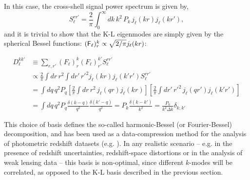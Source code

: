 \documentclass[twocolumn,amsfont,amssymb,amsmath, showpacs,balancelastpage, nofootinbib]{revtex4-1}
\begin{document}
    In this case, the cross-shell signal power spectrum is given by,
    \begin{equation}
      S_\ell^{rr'}=\frac{2}{\pi}\int_0^\infty dk\,k^2\,P_k\,j_\ell(kr)j_\ell(kr'),
    \end{equation}
    and it is trivial to show that the K-L eigenmodes are simply given by the spherical Bessel functions: $({\sf F}_\ell)^k_r\propto \sqrt{2/\pi}j_\ell(kr)$:
    \begin{widetext}
    \begin{align}\nonumber
      D_\ell^{kk'}&\equiv\sum_{r,r'}\left(F_\ell\right)^{k}_r\left(F_\ell\right)^{k'}_{r'}S_\ell^{rr'}\\\nonumber
      &\propto\frac{2}{\pi}\int dr\,r^2\int dr'\,r'^2 j_\ell(kr)j_\ell(k'r') S_\ell^{rr'}\\\nonumber
      &=\int dq\,q^2P_q\left[\frac{2}{\pi}\int dr\,r^2\,j_\ell(qr)j_\ell(kr)\right]\left[\frac{2}{\pi}\int dr'\,r'^2\,j_\ell(qr')j_\ell(k'r')\right]\\
      &=\int dq\,q^2P_q\frac{\delta(k-q)}{q^2}\frac{\delta(k'-q)}{q^2}=P_k\frac{\delta(k-k')}{k^2}=\frac{P_k}{k^2\Delta k}\delta_{k,k'}
    \end{align}
    \end{widetext}
   
    This choice of basis defines the so-called harmonic-Bessel (or Fourier-Bessel) decomposition, and has been used as a data-compression method for the analysis of photometric redshift datasets (e.g. \cite{2014MNRAS.442.1326K}). In any realistic scenario -- e.g. in the presence of redshift uncertainties, redshift-space distortions or in the analysis of weak lensing data -- this basis is non-optimal, since different $k$-modes will be correlated, as opposed to the K-L basis described in the previous section.
    
\end{document}
